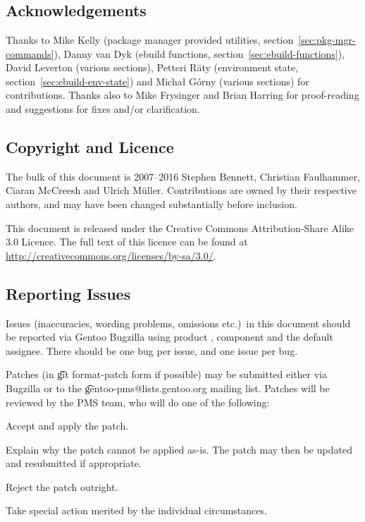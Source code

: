 \chapter*{}

\section*{Acknowledgements}

Thanks to Mike Kelly (package manager provided utilities, section~\ref{sec:pkg-mgr-commands}),
Danny van Dyk (ebuild functions, section~\ref{sec:ebuild-functions}), David Leverton (various
sections), Petteri Räty (environment state, section~\ref{sec:ebuild-env-state}) and Michał Górny
(various sections) for contributions. Thanks also to Mike Frysinger and Brian Harring for
proof-reading and suggestions for fixes and/or clarification.

\section*{Copyright and Licence}

The bulk of this document is \textcopyright{} 2007--2016 Stephen Bennett, Christian Faulhammer,
Ciaran McCreesh and Ulrich Müller. Contributions are owned by their respective authors, and may
have been changed substantially before inclusion.

This document is released under the Creative Commons Attribution-Share Alike 3.0 Licence. The full
text of this licence can be found at \url{http://creativecommons.org/licenses/by-sa/3.0/}.

\section*{Reporting Issues}

Issues (inaccuracies, wording problems, omissions etc.)\ in this document should be reported via
Gentoo Bugzilla using product , component  and the default
assignee. There should be one bug per issue, and one issue per bug.

Patches (in \t{git format-patch} form if possible) may be submitted either via Bugzilla or to the
\t{gentoo-pms@lists.gentoo.org} mailing list. Patches will be reviewed by the PMS team, who will do
one of the following:

\begin{compactitem}
\item Accept and apply the patch.
\item Explain why the patch cannot be applied as-is. The patch may then be updated and resubmitted
if \mbox{appropriate}.
\item Reject the patch outright.
\item Take special action merited by the individual circumstances.
\end{compactitem}

